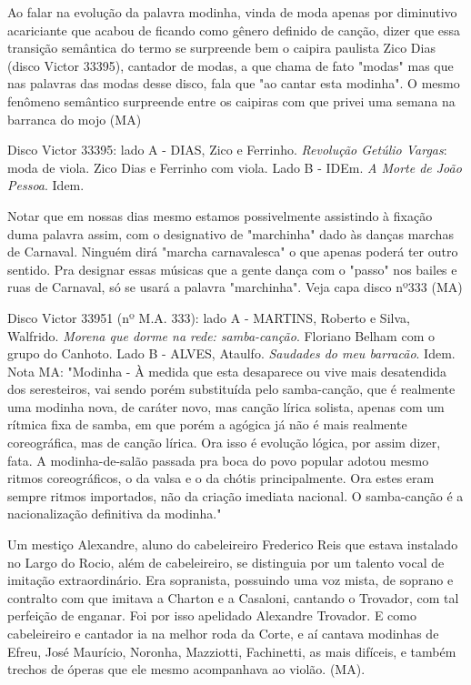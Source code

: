 Ao falar na evolução da palavra modinha, vinda de moda apenas por
diminutivo acariciante que acabou de ficando como gênero definido de
canção, dizer que essa transição semântica do termo se surpreende bem o
caipira paulista Zico Dias (disco Victor 33395), cantador de modas, a
que chama de fato "modas" mas que nas palavras das modas desse disco,
fala que "ao cantar esta modinha". O mesmo fenômeno semântico surpreende
entre os caipiras com que privei uma semana na barranca do mojo (MA)

Disco Victor 33395: lado A - DIAS, Zico e Ferrinho. \emph{Revolução
Getúlio Vargas}: moda de viola. Zico Dias e Ferrinho com viola. Lado B -
IDEm. \emph{A Morte de João Pessoa}. Idem.

Notar que em nossas dias mesmo estamos possivelmente assistindo à
fixação duma palavra assim, com o designativo de "marchinha" dado às
danças marchas de Carnaval. Ninguém dirá "marcha carnavalesca" o que
apenas poderá ter outro sentido. Pra designar essas músicas que a gente
dança com o "passo" nos bailes e ruas de Carnaval, só se usará a palavra
"marchinha". Veja capa disco nº333 (MA)

Disco Victor 33951 (nº M.A. 333): lado A - MARTINS, Roberto e Silva,
Walfrido. \emph{Morena que dorme na rede: samba-canção}. Floriano Belham
com o grupo do Canhoto. Lado B - ALVES, Ataulfo. \emph{Saudades do meu
barracão}. Idem. Nota MA: "Modinha - À medida que esta desaparece ou
vive mais desatendida dos seresteiros, vai sendo porém substituída pelo
samba-canção, que é realmente uma modinha nova, de caráter novo, mas
canção lírica solista, apenas com um rítmica fixa de samba, em que porém
a agógica já não é mais realmente coreográfica, mas de canção lírica.
Ora isso é evolução lógica, por assim dizer, fata. A modinha-de-salão
passada pra boca do povo popular adotou mesmo ritmos coreográficos, o da
valsa e o da chótis principalmente. Ora estes eram sempre ritmos
importados, não da criação imediata nacional. O samba-canção é a
nacionalização definitiva da modinha."

Um mestiço Alexandre, aluno do cabeleireiro Frederico Reis que estava
instalado no Largo do Rocio, além de cabeleireiro, se distinguia por um
talento vocal de imitação extraordinário. Era sopranista, possuindo uma
voz mista, de soprano e contralto com que imitava a Charton e a
Casaloni, cantando o Trovador, com tal perfeição de enganar. Foi por
isso apelidado Alexandre Trovador. E como cabeleireiro e cantador ia na
melhor roda da Corte, e aí cantava modinhas de Efreu, José Maurício,
Noronha, Mazziotti, Fachinetti, as mais difíceis, e também trechos de
óperas que ele mesmo acompanhava ao violão. (MA).

